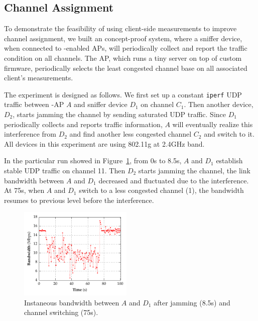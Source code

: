 \subsection{Channel Assignment}
\label{subsec-channel}

To demonstrate the feasibility of using client-side measurements to improve
channel assignment, we built an concept-proof system, where a sniffer device,
when connected to \PS{}-enabled APs, will periodically collect
and report the traffic condition on all channels. The AP, which runs a tiny 
server on top of custom firmware, periodically selects the least congested
channel base on all associated client's measurements.

The experiment is designed as follows. We first set up a constant \texttt{iperf}
UDP traffic between \PS{}-AP $A$ and sniffer device $D_1$ on channel
$C_1$. Then another device, $D_2$, starts jamming the channel by sending
saturated UDP traffic. Since $D_1$ periodically collects and reports traffic
information, $A$ will eventually realize this interference from $D_2$ and find
another less congested channel $C_2$ and switch to it. All devices in this
experiment are using 802.11g at 2.4GHz band. 

In the particular run showed in Figure~\ref{fig:bw}, from 0s to 8.5s, $A$ and
$D_1$ establish stable UDP traffic on channel 11. Then $D_2$ starts jamming the
channel, the link bandwidth between $A$ and $D_1$ decreased and fluctuated due
to the interference. At 75s, when $A$ and $D_1$ switch to a less congested
channel (1), the bandwidth resumes to previous level before the interference.

\begin{figure}[t!]
  \centering
  \includegraphics[width=0.48\textwidth]{./figures/ChannelBWGraph.pdf}
  \caption{Instaneous bandwidth between $A$ and $D_1$ after jamming (8.5s) and
  channel switching (75s).}
  \label{fig:bw}
\end{figure}
